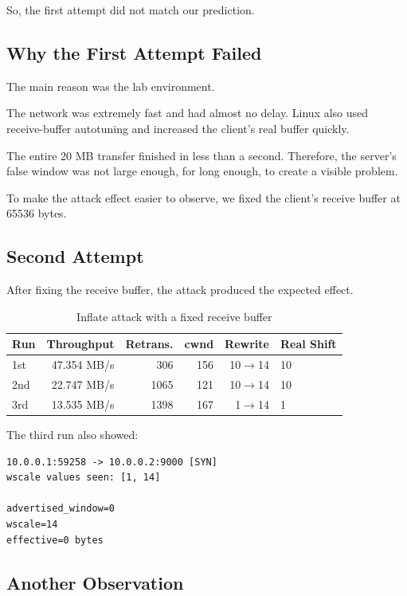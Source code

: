 \documentclass[11pt]{article}
\begin{document}
So, the first attempt did not match our prediction.

\subsection{Why the First Attempt Failed}

The main reason was the lab environment.

The network was extremely fast and had almost no delay. Linux also
used receive-buffer autotuning and increased the client's real buffer
quickly.

The entire 20 MB transfer finished in less than a second. Therefore,
the server's false window was not large enough, for long enough, to
create a visible problem.

To make the attack effect easier to observe, we fixed the client's
receive buffer at 65536 bytes.

\subsection{Second Attempt}

After fixing the receive buffer, the attack produced the expected
effect.

\begin{table}[h]
\centering
\begin{tabular}{lrrrrl}
\toprule
Run & Throughput & Retrans. & cwnd & Rewrite & Real Shift \\
\midrule
1st & 47.354 MB/s & 306  & 156 & 10$\to$14 & 10 \\
2nd & 22.747 MB/s & 1065 & 121 & 10$\to$14 & 10 \\
3rd & 13.535 MB/s & 1398 & 167 & 1$\to$14 & 1 \\
\bottomrule
\end{tabular}
\caption{Inflate attack with a fixed receive buffer}
\end{table}

The third run also showed:

\begin{lstlisting}
10.0.0.1:59258 -> 10.0.0.2:9000 [SYN]
wscale values seen: [1, 14]

advertised_window=0
wscale=14
effective=0 bytes
\end{lstlisting}

\subsection{Another Observation}
\end{document}
